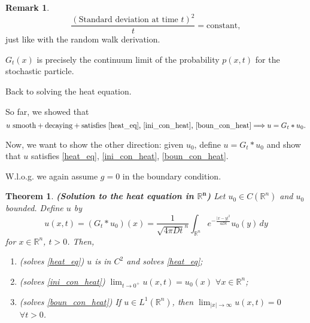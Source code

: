 \documentclass[12pt]{article}
\newtheorem{theorem}{Theorem}[section]
\theoremstyle{definition}
\newtheorem*{remark}{Remark}
\begin{document}
\begin{remark}
\[\frac{(\text{Standard deviation at time }t)^2}t=\text{constant},\]
just like with the random walk derivation.

$G_t(x)$ is precisely the continuum limit of the probability $p(x,t)$ for the stochastic particle.
\end{remark}

Back to solving the heat equation.

So far, we showed that
\[u\text{ smooth}+\text{decaying}+\text{satisfies \eqref{heat_eq}, \eqref{ini_con_heat}, \eqref{boun_con_heat}}\Longrightarrow u=G_t*u_0.\]

Now, we want to show the other direction: given $u_0$, define $u=G_t*u_0$ and show that $u$ satisfies \eqref{heat_eq}, \eqref{ini_con_heat}, \eqref{boun_con_heat}.

W.l.o.g. we again assume $g=0$ in the boundary condition.

\begin{theorem}\label{th_sol_heat}
\emph{\textbf{(Solution to the heat equation in $\boldsymbol{\mathbb R^n}$)}} Let $u_0\in C(\mathbb R^n)$ and $u_0$ bounded. Define $u$ by
\[u(x,t)=(G_t*u_0)(x)=\frac1{\sqrt{4\pi Dt}^n}\int_{\mathbb R^n}e^{-\frac{|x-y|^2}{4Dt}}u_0(y)\,dy\]
for $x\in\mathbb R^n$, $t>0$. Then,
\begin{enumerate}[label=(\arabic*)]
\item (solves \eqref{heat_eq}) $u$ is in $C^2$ and solves \eqref{heat_eq};
\item (solves \eqref{ini_con_heat}) $\displaystyle{\lim_{t\to0^+}u(x,t)=u_0(x)}$ $\forall x\in\mathbb R^n$;
\item  (solves \eqref{boun_con_heat}) If $u\in L^1(\mathbb R^n)$, then $\displaystyle{\lim_{|x|\to\infty}u(x,t)=0}$ $\forall t>0$.
\end{enumerate}
\end{theorem}
\end{document}
